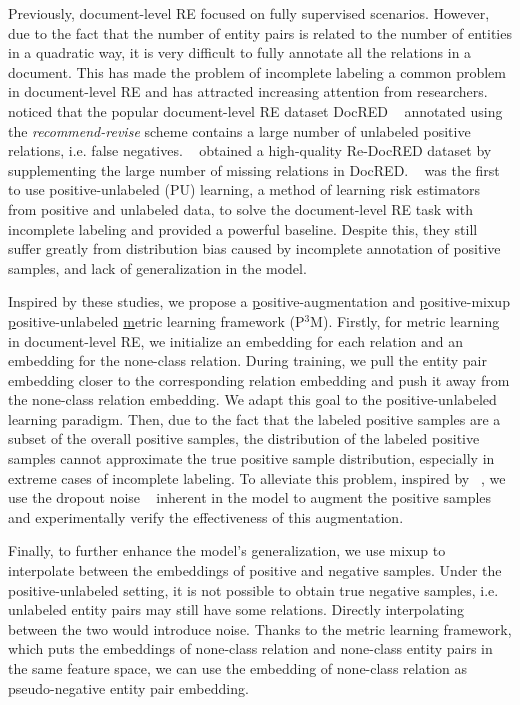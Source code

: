 \documentclass[letterpaper]{article} %
\begin{document}
Previously, document-level RE focused on fully supervised scenarios. However, due to the fact that the number of entity pairs is related to the number of entities in a quadratic way, it is very difficult to fully annotate all the relations in a document. This has made the problem of incomplete labeling a common problem in document-level RE and has attracted increasing attention from researchers. ~\cite{DBLP:conf/acl/HuangH0ZF022} noticed that the popular document-level RE dataset DocRED ~\cite{DBLP:conf/acl/YaoYLHLLLHZS19} annotated using the \emph{recommend-revise} scheme contains a large number of unlabeled positive relations, i.e. false negatives. ~\cite{DBLP:conf/emnlp/Tan0BNA22} obtained a high-quality Re-DocRED dataset by supplementing the large number of missing relations in DocRED. ~\cite{DBLP:conf/emnlp/WangLHZ22} was the first to use positive-unlabeled (PU) learning, a method of learning risk estimators from positive and unlabeled data, to solve the document-level RE task with incomplete labeling and provided a powerful baseline. Despite this, they still suffer greatly from distribution bias caused by incomplete annotation of positive samples, and lack of generalization in the model.

Inspired by these studies, we propose a \underline{p}ositive-augmentation and \underline{p}ositive-mixup \underline{p}ositive-unlabeled \underline{m}etric learning framework (P$^{3}$M). Firstly, for metric learning in document-level RE, we initialize an embedding for each relation and an embedding for the none-class relation. During training, we pull the entity pair embedding closer to the corresponding relation embedding and push it away from the none-class relation embedding. We adapt this goal to the positive-unlabeled learning paradigm. Then, due to the fact that the labeled positive samples are a subset of the overall positive samples, the distribution of the labeled positive samples cannot approximate the true positive sample distribution, especially in extreme cases of incomplete labeling. To alleviate this problem, inspired by ~\cite{DBLP:conf/emnlp/GaoYC21}, we use the dropout noise ~\cite{DBLP:journals/jmlr/SrivastavaHKSS14} inherent in the model to augment the positive samples and experimentally verify the effectiveness of this augmentation.

Finally, to further enhance the model's generalization, we use mixup to interpolate between the embeddings of positive and negative samples. Under the positive-unlabeled setting, it is not possible to obtain true negative samples, i.e. unlabeled entity pairs may still have some relations. Directly interpolating between the two would introduce noise. Thanks to the metric learning framework, which puts the embeddings of none-class relation and none-class entity pairs in the same feature space, we can use the embedding of none-class relation as pseudo-negative entity pair embedding.
\end{document}
